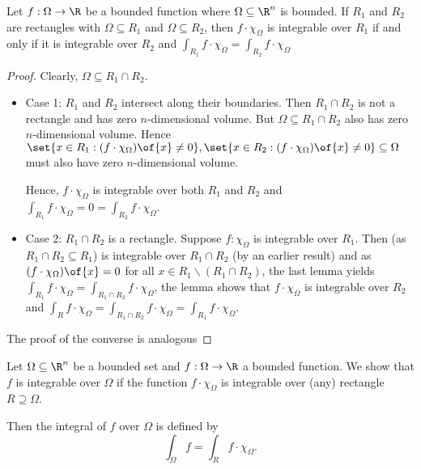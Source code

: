 \begin{proposition}
    Let $f: \Omega \to \R$ be a bounded function where $\Omega \subseteq \R^n$ is bounded. If $R_1$ and $R_2$ are rectangles with $\Omega \subseteq R_1$ and $\Omega \subseteq R_2$, then $f \cdot \chi_\Omega$ is integrable over $R_1$ if and only if it is integrable over $R_2$ and $\int_{R_1} f \cdot \chi_\Omega = \int_{R_2} f \cdot \chi_\Omega$
\end{proposition}
\begin{proof}
    Clearly, $\Omega \subseteq R_1 \cap R_2$.
    \begin{itemize}
        \item Case 1: $R_1$ and $R_2$ intersect along their boundaries. Then $R_1 \cap R_2$ is not a rectangle and has zero $n$-dimensional volume. But $\Omega \subseteq R_1 \cap R_2$ also has zero $n$-dimensional volume. Hence $\set{x \in R_1: (f \cdot \chi_\Omega)\of{x} \neq 0},\set{x \in R_2: (f \cdot \chi_\Omega)\of{x} \neq 0} \subseteq \Omega$ must also have zero $n$-dimensional volume.
        
        Hence, $f \cdot \chi_\Omega$ is integrable over both $R_1$ and $R_2$ and $\int_{R_1} f \cdot \chi_\Omega = 0 = \int_{R_2} f \cdot \chi_\Omega$.
        \item Case 2: $R_1 \cap R_2$ is a rectangle. Suppose $f: \chi_\Omega$ is integrable over $R_1$. Then (as $R_1 \cap R_2 \subseteq R_1$) is integrable over $R_1 \cap R_2$ (by an earlier result) and as $(f \cdot \chi_\Omega)\of{x} = 0$ for all $x \in R_1 \backslash (R_1 \cap R_2)$, the last lemma yields $\int_{R_1} f \cdot \chi_\Omega =  \int_{R_1 \cap R_2} f \cdot \chi_\Omega$, the lemma shows that $f \cdot \chi_\Omega$ is integrable over $R_2$ and $\int_R f \cdot \chi_\Omega = \int_{R_1 \cap R_2} f \cdot \chi_\Omega = \int_{R_1} f \cdot \chi_\Omega$.
    \end{itemize}
    The proof of the converse is analogous
\end{proof}

\begin{definition}
    Let $\Omega \subseteq \R^n$ be a bounded set and $f: \Omega \to \R$ a bounded function. We show that $f$ is integrable over $\Omega$ if the function $f \cdot \chi_\Omega$ is integrable over (any) rectangle $R \supseteq \Omega$.

    Then the integral of $f$ over $\Omega$ is defined by \[\int_\Omega f = \int_R f \cdot \chi_\Omega.\]
\end{definition}

